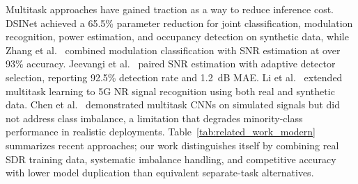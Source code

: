 \documentclass[conference]{IEEEtran}
\begin{document}
Multitask approaches have gained traction as a way to reduce inference cost. DSINet \cite{kim2023multitask} achieved a 65.5\% parameter reduction for joint classification, modulation recognition, power estimation, and occupancy detection on synthetic data, while Zhang et al.~\cite{zhang2021efficient} combined modulation classification with SNR estimation at over 93\% accuracy. Jeevangi et al.~\cite{jeevangi2022deep} paired SNR estimation with adaptive detector selection, reporting 92.5\% detection rate and 1.2~dB MAE. Li et al.~\cite{li2024multitask} extended multitask learning to 5G NR signal recognition using both real and synthetic data. Chen et al.~\cite{chen2021multitask} demonstrated multitask CNNs on simulated signals but did not address class imbalance, a limitation that degrades minority-class performance in realistic deployments. Table~\ref{tab:related_work_modern} summarizes recent approaches; our work distinguishes itself by combining real SDR training data, systematic imbalance handling, and competitive accuracy with lower model duplication than equivalent separate-task alternatives.
\end{document}
